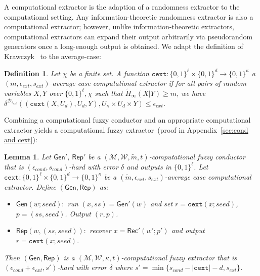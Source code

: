 \documentclass[11pt]{article}
\newcommand{\apref}[1]{\mbox{Appendix~\ref{#1}}}
\newcommand{\class}[1]{{\ensuremath{\mathsf{#1}}}}
\newcommand{\gen}{\ensuremath{\class{Gen}}\xspace}
\newcommand{\rep}{\ensuremath{\class{Rep}}\xspace}
\newcommand{\rec}{\ensuremath{\class{Rec}}\xspace}
\newcommand{\zo}{\ensuremath{\{0, 1\}}}
\newcommand{\cext}{\ensuremath{\mathtt{cext}}}
\newtheorem{lemma}[theorem]{Lemma}
\newtheorem{definition}[theorem]{Definition}
\begin{document}
A computational extractor is the adaption of a randomness extractor to the computational setting.  Any information-theoretic randomness extractor is also a computational extractor; however, unlike information-theoretic extractors, computational extractors can expand their output arbitrarily via pseudorandom generators once a long-enough output is obtained. We adapt the definition of Krawczyk~\cite{krawczyk2010cryptographic} to the average-case:
\begin{definition}
Let $\chi$ be a finite set.
A function $\cext: \zo^\ell \times \{0,1\}^d \rightarrow \{0,1\}^\kappa$ a \emph{$(m, \epsilon_{ext}, s_{ext})$-average-case computational extractor} if for all pairs
of random variables $X, Y$ over $\zo^\ell, \chi$ such that
$\tilde{H}_\infty(X|Y) \ge m$, we have $\delta^{\mathcal{D}_{s_{ext}}}((\cext(X, U_d), U_d, Y), U_\kappa\times
U_d \times Y) \le \epsilon_{ext}$.
\end{definition}

Combining a computational fuzzy conductor and an appropriate computational extractor yields a computational fuzzy extractor~(proof in \apref{sec:cond and cext}):

\begin{lemma}
\label{lem:cond and cext}
Let $\gen'$, $\rep'$ be a $(\mathcal{M}, \mathcal{W}, \tilde{m}, t)$-computational fuzzy conductor that is $(\epsilon_{cond}, s_{cond})$-hard with error $\delta$ and outputs in $\zo^\ell$.  Let $\cext:\zo^\ell\times \zo^d\rightarrow \zo^\kappa$ be a $(\tilde{m}, \epsilon_{ext}, s_{ext})$-average case computational extractor.  Define $(\gen, \rep)$ as:
\begin{itemize}
\item $\gen(w; seed):$ run $(x, ss)= \gen'(w)$ and set $r = \cext(x; seed)$, $p = (ss, seed)$.  Output $(r, p)$.
\item $\rep(w, (ss, seed)):$ recover $x = \rec'(w'; p')$ and output $r = \cext(x; seed)$.
\end{itemize}
Then $(\gen, \rep)$ is a $(\mathcal{M}, \mathcal{W}, \kappa, t)$-computational fuzzy extractor that is $(\epsilon_{cond}+\epsilon_{ext}, s')$-hard with error $\delta$ where $s' = \min\{s_{cond} - |\cext| -d, s_{ext}\}$.
\end{lemma}
\end{document}
